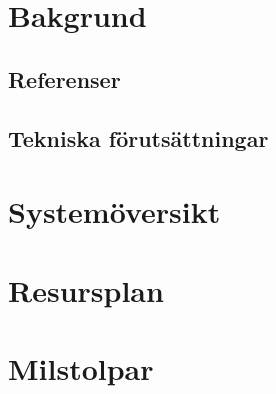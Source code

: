 \documentclass{article}
\begin{document}
\section{Bakgrund}

\subsection{Referenser}

\subsection{Tekniska förutsättningar}

\section{Systemöversikt}

\section{Resursplan}

\section{Milstolpar}
\end{document}
